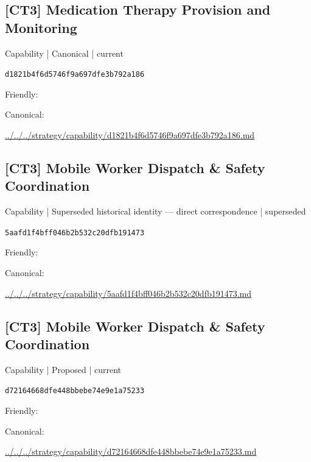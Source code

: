 \documentclass[10pt,a4paper]{article}
\begin{document}
\subsection*{[CT3] Medication Therapy Provision and Monitoring}
{\small Capability | Canonical | current}\par
\texttt{d1821b4f6d5746f9a697dfe3b792a186}\par
Friendly: \par
Canonical: \par
{\footnotesize\url{../../../strategy/capability/d1821b4f6d5746f9a697dfe3b792a186.md}}\par
\subsection*{[CT3] Mobile Worker Dispatch \& Safety Coordination}
{\small Capability | Superseded historical identity — direct correspondence | superseded}\par
\texttt{5aafd1f4bff046b2b532c20dfb191473}\par
Friendly: \par
Canonical: \par
{\footnotesize\url{../../../strategy/capability/5aafd1f4bff046b2b532c20dfb191473.md}}\par
\subsection*{[CT3] Mobile Worker Dispatch \& Safety Coordination}
{\small Capability | Proposed | current}\par
\texttt{d72164668dfe448bbebe74e9e1a75233}\par
Friendly: \par
Canonical: \par
{\footnotesize\url{../../../strategy/capability/d72164668dfe448bbebe74e9e1a75233.md}}\par
\end{document}
